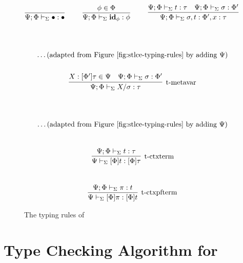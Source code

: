 \documentclass[10pt]{article}
\begin{document}
%
\begin{figure}[ht!]
\\
\begin{gather*}
\infer[]{
  \ctypeof{\Sigma}{\Psi}{\Phi}{\bullet}{\bullet}
}{
}
\qquad
\infer[]{
  \ctypeof{\Sigma}{\Psi}{\Phi}{\idsub{\phi}}{\phi}
}{
  \phi \in \Phi
}
\qquad
\infer[]{
  \ctypeof{\Sigma}{\Psi}{\Phi}{\sigma,t}{\Phi',x:\tau}
}{
  \ctypeof{\Sigma}{\Psi}{\Phi}{t}{\tau}
  &
  \ctypeof{\Sigma}{\Psi}{\Phi}{\sigma}{\Phi'}
}
\end{gather*}
\\
\\
\begin{gather*}
  \ldots \mbox{(adapted from Figure~\ref{fig:stlce-typing-rules} by adding $\Psi$)}
  \\
  \\
  \infer[\mbox{\typmetavar}]{
    \ctypeof{\Sigma}{\Psi}{\Phi}{\metavar{X}{\sigma}}{\tau}
  }{
    X:\ct{\Phi'}{\tau} \in \Psi
    & 
    \ctypeof{\Sigma}{\Psi}{\Phi}{\sigma}{\Phi'}
  }
\end{gather*}
\\
\\
\begin{gather*}
  \ldots \mbox{(adapted from Figure~\ref{fig:stlce-typing-rules} by adding $\Psi$)}
\end{gather*}
\\
\begin{gather*}
  \infer[\mbox{\typctxterm}]{
    \cmtypeof{\Sigma}{\Psi}{\ct{\Phi}{t}}{\ct{\Phi}{\tau}}
  }{
    \ctypeof{\Sigma}{\Psi}{\Phi}{t}{\tau}
  }
\end{gather*}
\\
\begin{gather*}
  \infer[\mbox{\typctxpfterm}]{
    \cmtypeof{\Sigma}{\Psi}{\ct{\Phi}{\pi}}{\ct{\Phi}{t}}
  }{
    \ctypeof{\Sigma}{\Psi}{\Phi}{\pi}{t}
  }
\end{gather*}

\caption{The typing rules of \STLCC}
\label{fig:stlcc-typing-rules}
\end{figure}


\section{Type Checking Algorithm for \STLCC}
\end{document}
